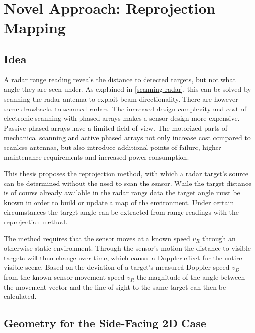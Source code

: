 
\chapter{Novel Approach: Reprojection
Mapping}\label{novel-approach-reprojection-mapping}

\section{Idea}\label{idea}

A radar range reading reveals the distance to detected targets, but not what angle they are seen under. As explained in \cref{scanning-radar}, this can be solved by scanning the radar antenna to exploit beam directionality. There are however some drawbacks to scanned radars. The increased design complexity and cost of electronic scanning with phased arrays makes a sensor design more expensive. Passive phased arrays have a limited field of view. The motorized parts of mechanical scanning and active phased arrays not only increase cost compared to scanless antennas, but also introduce additional points of failure, higher maintenance requirements and increased power consumption.

This thesis proposes the reprojection method, with which a radar target's source can be determined without the need to scan the sensor. While the target distance is of course already available in the radar range data the target angle must be known in order to build or update a map of the environment. Under certain circumstances the target angle can be extracted from range readings with the reprojection method.

The method requires that the sensor moves at a known speed \(v_R\) through an otherwise static environment. Through the sensor's motion the distance to visible targets will then change over time, which causes a Doppler effect for the entire visible scene. Based on the deviation of a target's measured Doppler speed \(v_D\) from the known sensor movement speed \(v_R\) the magnitude of the angle between the movement vector and the line-of-sight to the same target can then be calculated.

\section{Geometry for the Side-Facing 2D Case}\label{geometry-for-the-side-facing-case}

